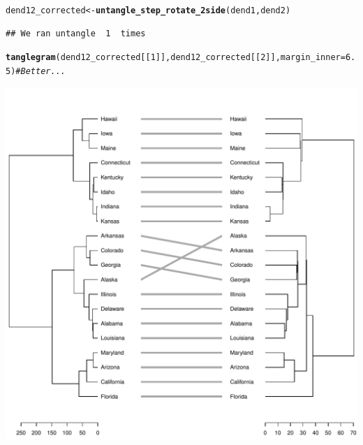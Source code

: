 \documentclass[shortnames,nojss,article]{jss}\usepackage[]{graphicx}\usepackage[]{color}
\makeatletter
\def\maxwidth{ %
  \ifdim\Gin@nat@width>\linewidth
    \linewidth
  \else
    \Gin@nat@width
  \fi
}
\newcommand{\hlnum}[1]{\textcolor[rgb]{0.686,0.059,0.569}{#1}}%
\newcommand{\hlcom}[1]{\textcolor[rgb]{0.678,0.584,0.686}{\textit{#1}}}%
\newcommand{\hlstd}[1]{\textcolor[rgb]{0.345,0.345,0.345}{#1}}%
\newcommand{\hlkwb}[1]{\textcolor[rgb]{0.69,0.353,0.396}{#1}}%
\newcommand{\hlkwc}[1]{\textcolor[rgb]{0.333,0.667,0.333}{#1}}%
\newcommand{\hlkwd}[1]{\textcolor[rgb]{0.737,0.353,0.396}{\textbf{#1}}}%
\newenvironment{kframe}{%
 \def\at@end@of@kframe{}%
 \ifinner\ifhmode%
  \def\at@end@of@kframe{\end{minipage}}%
  \begin{minipage}{\columnwidth}%
 \fi\fi%
 \def\FrameCommand##1{\hskip\@totalleftmargin \hskip-\fboxsep
 \colorbox{shadecolor}{##1}\hskip-\fboxsep
     \hskip-\linewidth \hskip-\@totalleftmargin \hskip\columnwidth}%
 \MakeFramed {\advance\hsize-\width
   \@totalleftmargin\z@ \linewidth\hsize
   \@setminipage}}%
 {\par\unskip\endMakeFramed%
 \at@end@of@kframe}
\newenvironment{knitrout}{}{} %
\makeatother
\begin{document}
\begin{knitrout}
\begin{kframe}
\begin{alltt}
\hlstd{dend12_corrected} \hlkwb{<-} \hlkwd{untangle_step_rotate_2side}\hlstd{(dend1, dend2)}
\end{alltt}
\begin{verbatim}
## We ran untangle  1  times
\end{verbatim}
\begin{alltt}
\hlkwd{tanglegram}\hlstd{(dend12_corrected[[}\hlnum{1}\hlstd{]], dend12_corrected[[}\hlnum{2}\hlstd{]],} \hlkwc{margin_inner} \hlstd{=} \hlnum{6.5}\hlstd{)}  \hlcom{# Better...}
\end{alltt}
\end{kframe}

{\centering \includegraphics[width=\maxwidth]{figure/unnamed-chunk-403} 

}



\end{knitrout}
\end{document}
